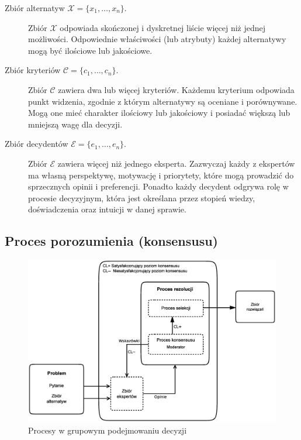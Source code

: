 \begin{description}
  \item[Zbiór alternatyw $ \mathcal{X} = \{ x_1, \dotsc, x_n \}.$] Zbiór
  $\mathcal{X}$ odpowiada skończonej i dyskretnej liście więcej niż jednej
  możliwości. Odpowiednie właściwości (lub atrybuty) każdej alternatywy mogą być
  ilościowe lub jakościowe.
  
  \item[Zbiór kryteriów $ \mathcal{C} = \{ c_1, \dotsc, c_n \}.$] Zbiór
  $\mathcal{C}$ zawiera dwa lub więcej kryteriów. Każdemu kryterium odpowiada
  punkt widzenia, zgodnie z którym alternatywy są oceniane i porównywane. Mogą
  one mieć charakter ilościowy lub jakościowy i posiadać większą lub mniejszą
  wagę dla decyzji.
  
  \item[Zbiór decydentów $ \mathcal{E} = \{ e_1, \dotsc, e_n \}.$] Zbiór
  $\mathcal{E}$ zawiera więcej niż jednego eksperta. Zazwyczaj każdy z ekspertów
  ma własną perspektywę, motywację i priorytety, które mogą prowadzić do
  sprzecznych opinii i preferencji. Ponadto każdy decydent odgrywa rolę w
  procesie decyzyjnym, która jest określana przez stopień wiedzy, doświadczenia
  oraz intuicji w danej sprawie.

\end{description}

\subsection{Proces porozumienia (konsensusu)}

\begin{figure}[ht]
  \includegraphics[width=\linewidth]
    {chapters/modelinggroupdecision/schemat_procesu}
  \caption{Procesy w grupowym podejmowaniu decyzji}
  \label{fig:Procesy_w_grupowym_podejmowaniu_decyzji}
\end{figure}

